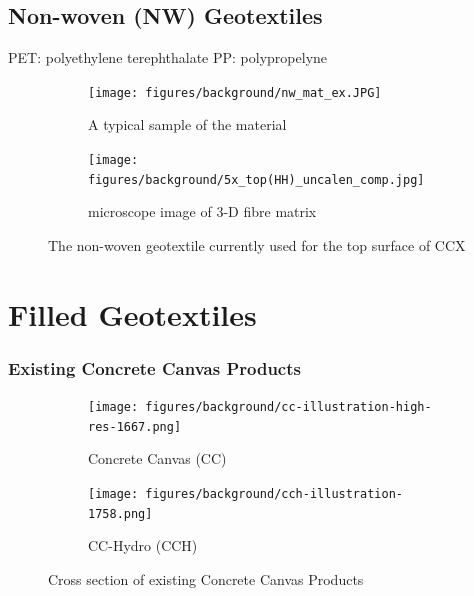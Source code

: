 \documentclass[12pt]{report}
\begin{document}
    \subsection{Non-woven (NW) Geotextiles}
    PET: polyethylene terephthalate
    PP: polypropelyne 
    \begin{figure}[ht]
    \begin{subfigure}{.5\textwidth}
        \centering
        \texttt{[image: figures/background/nw\_mat\_ex.JPG]}  
        \caption{A typical sample of the material}
        \label{fig:non_woven_example_roll}
    \end{subfigure}
    \begin{subfigure}{.5\textwidth}
        \centering
        \texttt{[image: figures/background/5x\_top(HH)\_uncalen\_comp.jpg]}  
        \caption{microscope image of 3-D fibre matrix}
        \label{fig:non_woven_top_microscope}
    \end{subfigure}
    \caption{The non-woven geotextile currently used for the top surface of CCX}
    \label{fig:non_woven_example}
    \end{figure}
    
    \pagebreak
    \section{Filled Geotextiles}
    
    
    \subsubsection{Existing Concrete Canvas Products}
    \begin{figure}[ht]
    \begin{subfigure}{.5\textwidth}
        \centering
        \texttt{[image: figures/background/cc-illustration-high-res-1667.png]}  
        \caption{Concrete Canvas (CC)}
        \label{fig:sub-first}
    \end{subfigure}
    \begin{subfigure}{.5\textwidth}
        \centering
        \texttt{[image: figures/background/cch-illustration-1758.png]}  
        \caption{CC-Hydro (CCH)}
        \label{fig:sub-second}
    \end{subfigure}
    \caption{Cross section of existing Concrete Canvas Products}
    \label{fig:fig}
    \end{figure}
\end{document}

